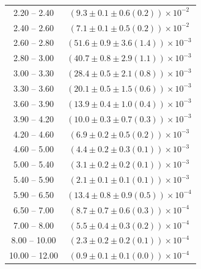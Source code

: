 \begin{table}
\begin{center}
\begin{tabular}{ c | c }
2.20 -- 2.40 & $(9.3\pm0.1\pm0.6(0.2))\times10^{-2}$ \\ 
2.40 -- 2.60 & $(7.1\pm0.1\pm0.5(0.2))\times10^{-2}$ \\ 
2.60 -- 2.80 & $(51.6\pm0.9\pm3.6(1.4))\times10^{-3}$ \\ 
2.80 -- 3.00 & $(40.7\pm0.8\pm2.9(1.1))\times10^{-3}$ \\ 
3.00 -- 3.30 & $(28.4\pm0.5\pm2.1(0.8))\times10^{-3}$ \\ 
3.30 -- 3.60 & $(20.1\pm0.5\pm1.5(0.6))\times10^{-3}$ \\ 
3.60 -- 3.90 & $(13.9\pm0.4\pm1.0(0.4))\times10^{-3}$ \\ 
3.90 -- 4.20 & $(10.0\pm0.3\pm0.7(0.3))\times10^{-3}$ \\ 
4.20 -- 4.60 & $(6.9\pm0.2\pm0.5(0.2))\times10^{-3}$ \\ 
4.60 -- 5.00 & $(4.4\pm0.2\pm0.3(0.1))\times10^{-3}$ \\ 
5.00 -- 5.40 & $(3.1\pm0.2\pm0.2(0.1))\times10^{-3}$ \\ 
5.40 -- 5.90 & $(2.1\pm0.1\pm0.1(0.1))\times10^{-3}$ \\ 
5.90 -- 6.50 & $(13.4\pm0.8\pm0.9(0.5))\times10^{-4}$ \\ 
6.50 -- 7.00 & $(8.7\pm0.7\pm0.6(0.3))\times10^{-4}$ \\ 
7.00 -- 8.00 & $(5.5\pm0.4\pm0.3(0.2))\times10^{-4}$ \\ 
8.00 -- 10.00 & $(2.3\pm0.2\pm0.2(0.1))\times10^{-4}$ \\ 
10.00 -- 12.00 & $(0.9\pm0.1\pm0.1(0.0))\times10^{-4}$ \\ 
\hline
\end{tabular}
\end{center}
\end{table}
 
